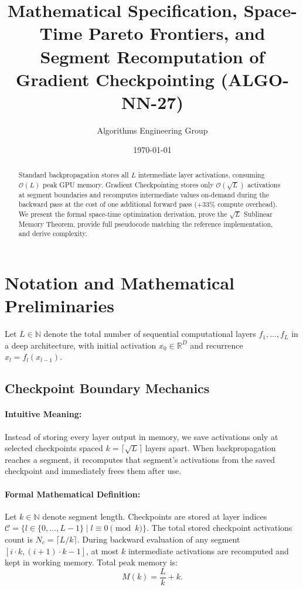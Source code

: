\documentclass[11pt]{article}
\title{\textbf{Mathematical Specification, Space-Time Pareto Frontiers, and Segment Recomputation of Gradient Checkpointing (ALGO-NN-27)}}
\author{Algorithms Engineering Group}
\date{\today}
\begin{document}
\maketitle

\begin{abstract}
Standard backpropagation stores all $L$ intermediate layer activations, consuming $\mathcal{O}(L)$ peak GPU memory. Gradient Checkpointing stores only $\mathcal{O}(\sqrt{L})$ activations at segment boundaries and recomputes intermediate values on-demand during the backward pass at the cost of one additional forward pass ($+33\%$ compute overhead). We present the formal space-time optimization derivation, prove the $\sqrt{L}$ Sublinear Memory Theorem, provide full pseudocode matching the reference implementation, and derive complexity.
\end{abstract}

\section{Notation and Mathematical Preliminaries}
\label{sec:notation}

Let $L \in \mathbb{N}$ denote the total number of sequential computational layers $f_1, \dots, f_L$ in a deep architecture, with initial activation $x_0 \in \mathbb{R}^D$ and recurrence $x_l = f_l(x_{l-1})$.

\subsection{Checkpoint Boundary Mechanics}
\paragraph{Intuitive Meaning:} Instead of storing every layer output in memory, we save activations only at selected checkpoints spaced $k = \lceil\sqrt{L}\rceil$ layers apart. When backpropagation reaches a segment, it recomputes that segment's activations from the saved checkpoint and immediately frees them after use.

\paragraph{Formal Mathematical Definition:}
Let $k \in \mathbb{N}$ denote segment length. Checkpoints are stored at layer indices $\mathcal{C} = \{l \in \{0, \dots, L-1\} \mid l \equiv 0 \pmod k\}$.
The total stored checkpoint activations count is $N_c = \lceil L / k \rceil$.
During backward evaluation of any segment $[i \cdot k, (i+1) \cdot k - 1]$, at most $k$ intermediate activations are recomputed and kept in working memory.
Total peak memory is:
\begin{equation}
\label{eq:mem_objective}
M(k) = \frac{L}{k} + k.
\end{equation}
\end{document}
